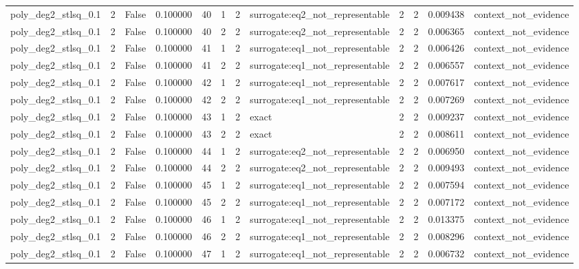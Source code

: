 \begin{tabular}{lrrrrrrlrrrl}
poly\_deg2\_stlsq\_0.1 & 2 & False & 0.100000 & 40 & 1 & 2 & surrogate:eq2\_not\_representable & 2 & 2 & 0.009438 & context\_not\_evidence \\
poly\_deg2\_stlsq\_0.1 & 2 & False & 0.100000 & 40 & 2 & 2 & surrogate:eq2\_not\_representable & 2 & 2 & 0.006365 & context\_not\_evidence \\
poly\_deg2\_stlsq\_0.1 & 2 & False & 0.100000 & 41 & 1 & 2 & surrogate:eq1\_not\_representable & 2 & 2 & 0.006426 & context\_not\_evidence \\
poly\_deg2\_stlsq\_0.1 & 2 & False & 0.100000 & 41 & 2 & 2 & surrogate:eq1\_not\_representable & 2 & 2 & 0.006557 & context\_not\_evidence \\
poly\_deg2\_stlsq\_0.1 & 2 & False & 0.100000 & 42 & 1 & 2 & surrogate:eq1\_not\_representable & 2 & 2 & 0.007617 & context\_not\_evidence \\
poly\_deg2\_stlsq\_0.1 & 2 & False & 0.100000 & 42 & 2 & 2 & surrogate:eq1\_not\_representable & 2 & 2 & 0.007269 & context\_not\_evidence \\
poly\_deg2\_stlsq\_0.1 & 2 & False & 0.100000 & 43 & 1 & 2 & exact & 2 & 2 & 0.009237 & context\_not\_evidence \\
poly\_deg2\_stlsq\_0.1 & 2 & False & 0.100000 & 43 & 2 & 2 & exact & 2 & 2 & 0.008611 & context\_not\_evidence \\
poly\_deg2\_stlsq\_0.1 & 2 & False & 0.100000 & 44 & 1 & 2 & surrogate:eq2\_not\_representable & 2 & 2 & 0.006950 & context\_not\_evidence \\
poly\_deg2\_stlsq\_0.1 & 2 & False & 0.100000 & 44 & 2 & 2 & surrogate:eq2\_not\_representable & 2 & 2 & 0.009493 & context\_not\_evidence \\
poly\_deg2\_stlsq\_0.1 & 2 & False & 0.100000 & 45 & 1 & 2 & surrogate:eq1\_not\_representable & 2 & 2 & 0.007594 & context\_not\_evidence \\
poly\_deg2\_stlsq\_0.1 & 2 & False & 0.100000 & 45 & 2 & 2 & surrogate:eq1\_not\_representable & 2 & 2 & 0.007172 & context\_not\_evidence \\
poly\_deg2\_stlsq\_0.1 & 2 & False & 0.100000 & 46 & 1 & 2 & surrogate:eq1\_not\_representable & 2 & 2 & 0.013375 & context\_not\_evidence \\
poly\_deg2\_stlsq\_0.1 & 2 & False & 0.100000 & 46 & 2 & 2 & surrogate:eq1\_not\_representable & 2 & 2 & 0.008296 & context\_not\_evidence \\
poly\_deg2\_stlsq\_0.1 & 2 & False & 0.100000 & 47 & 1 & 2 & surrogate:eq1\_not\_representable & 2 & 2 & 0.006732 & context\_not\_evidence \\

\end{tabular}
